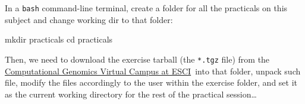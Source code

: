 \documentclass[10pt,a4paper,]{article}
\newenvironment{Shaded}{}{}
\newcommand{\BuiltInTok}[1]{#1}
\newcommand{\FunctionTok}[1]{\textcolor[rgb]{0.02,0.16,0.49}{#1}}
\newcommand{\NormalTok}[1]{#1}
\begin{document}
In a \texttt{bash} command-line terminal, create a folder for all the
practicals on this subject and change working dir to that folder:

\begin{Shaded}
\begin{Highlighting}[]
\FunctionTok{mkdir}\NormalTok{ practicals}
\BuiltInTok{cd}\NormalTok{ practicals}
\end{Highlighting}
\end{Shaded}

Then, we need to download the exercise tarball (the \texttt{*.tgz} file)
from the
\href{https://aula.esci.upf.edu/course/view.php?id=8516}{Computational Genomics Virtual Campus at ESCI}~into
that folder, unpack such file, modify the files accordingly to the user
within the exercise folder, and set it as the current working directory
for the rest of the practical session\ldots{}
\end{document}
